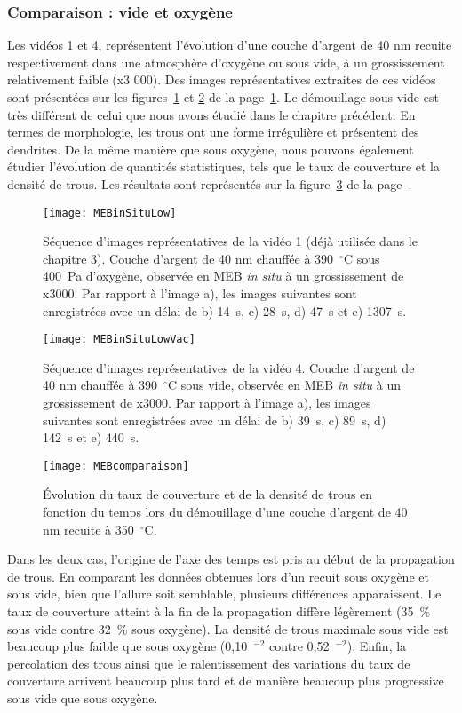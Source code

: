 		\subsubsection{Comparaison : vide et oxygène}
Les vidéos 1 et 4, représentent l’évolution d’une couche d’argent de 40 nm recuite respectivement dans une atmosphère d’oxygène ou sous vide, à un grossissement relativement faible (x3 000). Des images représentatives extraites de ces vidéos sont présentées sur les figures~\ref{MEBinSituLow} et \ref{MEBinSituLowVac} de la page~\ref{MEBinSituLow}. Le démouillage sous vide est très différent de celui que nous avons étudié dans le chapitre précédent. En termes de morphologie, les trous ont une forme irrégulière et présentent des dendrites. De la même manière que sous oxygène, nous pouvons également étudier l’évolution de quantités statistiques, tels que le taux de couverture et la densité de trous. Les résultats sont représentés sur la figure~\ref{MEBcomparaison} de la page~\pageref{MEBcomparaison}.\par 
\begin{figure}[!p]
\centering
\texttt{[image: MEBinSituLow]}
\caption{Séquence d’images représentatives de la vidéo 1 (déjà utilisée dans le chapitre 3). Couche d’argent de 40 nm chauffée à 390~$^\circ$C sous 400~Pa d’oxygène, observée en MEB \textit{in situ} à un grossissement de x3000. Par rapport à l’image a), les images suivantes sont enregistrées avec un délai de b) 14~s, c) 28~s, d) 47~s et e) 1307~s.}
\label{MEBinSituLow}
\end{figure}
\begin{figure}[!p]
\centering
\texttt{[image: MEBinSituLowVac]}
\caption{Séquence d’images représentatives de la vidéo 4. Couche d’argent de 40 nm chauffée à 390~$^\circ$C sous vide, observée en MEB \textit{in situ} à un grossissement de x3000. Par rapport à l’image a), les images suivantes sont enregistrées avec un délai de b) 39~s, c) 89~s, d) 142~s et e) 440~s.}
\label{MEBinSituLowVac}
\end{figure}
\begin{figure}[!p]
\centering
\texttt{[image: MEBcomparaison]}
\caption{Évolution du taux de couverture et de la densité de trous en fonction du temps lors du démouillage d’une couche d’argent de 40 nm recuite à 350~$^\circ$C.}
\label{MEBcomparaison}
\end{figure}
Dans les deux cas, l’origine de l’axe des temps est pris au début de la propagation de trous. En comparant les données obtenues lors d’un recuit sous oxygène et sous vide, bien que l’allure soit semblable, plusieurs différences apparaissent. Le taux de couverture atteint à la fin de la propagation diffère légèrement (35~\% sous vide contre 32~\% sous oxygène). La densité de trous maximale sous vide est beaucoup plus faible que sous oxygène (0,10~\micro\meter$^{-2}$ contre 0,52~\micro\meter$^{-2}$). Enfin, la percolation des trous ainsi que le ralentissement des variations du taux de couverture arrivent beaucoup plus tard et de manière beaucoup plus progressive sous vide que sous oxygène.\par 
